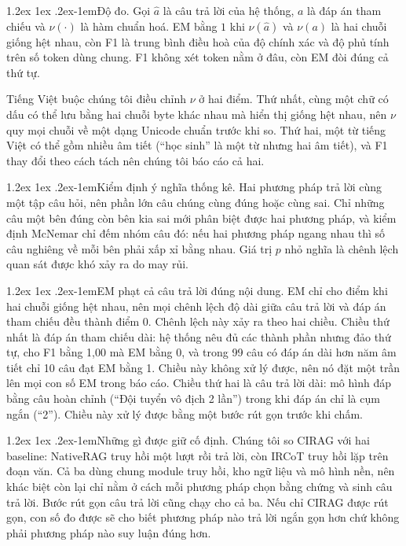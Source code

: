 \documentclass[11pt]{article}
\makeatletter
\renewcommand\paragraph{\@startsection{paragraph}{4}{\z@}%
  {1.2ex \@plus1ex \@minus.2ex}{-1em}{\normalfont\normalsize\bfseries}}
\makeatother
\begin{document}
\paragraph{Độ đo.} Gọi $\hat{a}$ là câu trả lời của hệ thống, $a$ là đáp án tham chiếu và
$\nu(\cdot)$ là hàm chuẩn hoá. EM bằng $1$ khi $\nu(\hat{a})$ và $\nu(a)$ là hai chuỗi giống hệt nhau, còn F1 là trung
bình điều hoà của độ chính xác và độ phủ tính trên số token dùng chung. F1 không xét token
nằm ở đâu, còn EM đòi đúng cả thứ tự.

Tiếng Việt buộc chúng tôi điều chỉnh $\nu$ ở hai điểm. Thứ nhất, cùng một chữ có dấu có thể
lưu bằng hai chuỗi byte khác nhau mà hiển thị giống hệt nhau, nên $\nu$ quy mọi chuỗi về một
dạng Unicode chuẩn trước khi so. Thứ hai, một từ tiếng Việt có thể gồm nhiều âm tiết
(``học sinh'' là một từ nhưng hai âm tiết), và F1 thay đổi theo cách tách nên chúng tôi báo
cáo cả hai.

\paragraph{Kiểm định ý nghĩa thống kê.} Hai phương pháp trả lời cùng một tập câu hỏi, nên
phần lớn câu chúng cùng đúng hoặc cùng sai. Chỉ những câu một bên đúng còn bên kia sai mới
phân biệt được hai phương pháp, và kiểm định McNemar chỉ đếm nhóm câu đó: nếu hai phương
pháp ngang nhau thì số câu nghiêng về mỗi bên phải xấp xỉ bằng nhau. Giá trị $p$ nhỏ nghĩa
là chênh lệch quan sát được khó xảy ra do may rủi.

\paragraph{EM phạt cả câu trả lời đúng nội dung.} EM chỉ cho điểm khi hai chuỗi giống hệt
nhau, nên mọi chênh lệch độ dài giữa câu trả lời và đáp án tham chiếu đều thành điểm 0.
Chênh lệch này xảy ra theo hai chiều. Chiều thứ nhất là đáp án tham chiếu dài: hệ thống nêu
đủ các thành phần nhưng đảo thứ tự, cho F1 bằng 1,00 mà EM bằng 0, và trong 99 câu có đáp án
dài hơn năm âm tiết chỉ 10 câu đạt EM bằng 1. Chiều này không xử lý được, nên nó đặt một
trần lên mọi con số EM trong báo cáo. Chiều thứ hai là câu trả lời dài: mô hình đáp bằng câu
hoàn chỉnh (``Đội tuyển vô địch 2 lần'') trong khi đáp án chỉ là cụm ngắn (``2''). Chiều này
xử lý được bằng một bước rút gọn trước khi chấm.

\paragraph{Những gì được giữ cố định.} Chúng tôi so CIRAG với hai baseline: NativeRAG truy
hồi một lượt rồi trả lời, còn IRCoT truy hồi lặp trên đoạn văn. Cả ba dùng chung module truy
hồi, kho ngữ liệu và mô hình nền, nên khác biệt còn lại chỉ nằm ở cách mỗi phương pháp chọn
bằng chứng và sinh câu trả lời. Bước rút gọn câu trả lời cũng chạy cho cả ba. Nếu chỉ CIRAG
được rút gọn, con số đo được sẽ cho biết phương pháp nào trả lời ngắn gọn hơn chứ không phải
phương pháp nào suy luận đúng hơn.
\end{document}
